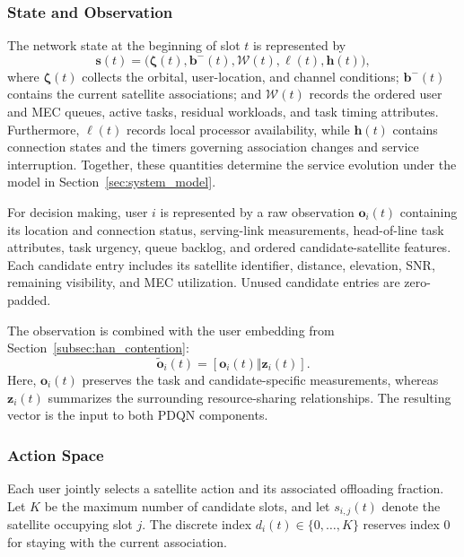 \documentclass[journal]{IEEEtran}
\begin{document}
\subsubsection{State and Observation}

The network state at the beginning of slot $t$
is represented by
\begin{equation}
\mathbf{s}(t)
=
\big(
\boldsymbol{\zeta}(t),
\mathbf{b}^{-}(t),
\mathcal{W}(t),
\boldsymbol{\ell}(t),
\boldsymbol{h}(t)
\big),
\label{eq:rl_network_state}
\end{equation}
where $\boldsymbol{\zeta}(t)$ collects the orbital,
user-location, and channel conditions;
$\mathbf{b}^{-}(t)$ contains the current satellite
associations; and $\mathcal{W}(t)$ records the
ordered user and MEC queues, active tasks,
residual workloads, and task timing attributes.
Furthermore, $\boldsymbol{\ell}(t)$ records local
processor availability, while $\boldsymbol{h}(t)$
contains connection states and the timers governing
association changes and service interruption.
Together, these quantities determine the service
evolution under the model in
Section~\ref{sec:system_model}.

For decision making, user $i$ is represented by
a raw observation $\mathbf{o}_i(t)$ containing
its location and connection status, serving-link
measurements, head-of-line task attributes,
task urgency, queue backlog, and ordered
candidate-satellite features.
Each candidate entry includes its satellite
identifier, distance, elevation, SNR, remaining
visibility, and MEC utilization.
Unused candidate entries are zero-padded.

The observation is combined with the user embedding
from Section~\ref{subsec:han_contention}:
\begin{equation}
\widetilde{\mathbf{o}}_i(t)
=
\left[
\mathbf{o}_i(t)\Vert\mathbf{z}_i(t)
\right].
\label{eq:fused_pdqn_observation}
\end{equation}
Here, $\mathbf{o}_i(t)$ preserves the task and
candidate-specific measurements, whereas
$\mathbf{z}_i(t)$ summarizes the surrounding
resource-sharing relationships.
The resulting vector is the input to both
PDQN components.

\subsubsection{Action Space}

Each user jointly selects a satellite action
and its associated offloading fraction.
Let $K$ be the maximum number of candidate slots,
and let $s_{i,j}(t)$ denote the satellite occupying
slot $j$.
The discrete index $d_i(t)\in\{0,\ldots,K\}$
reserves index $0$ for staying with the current
association.
\end{document}
